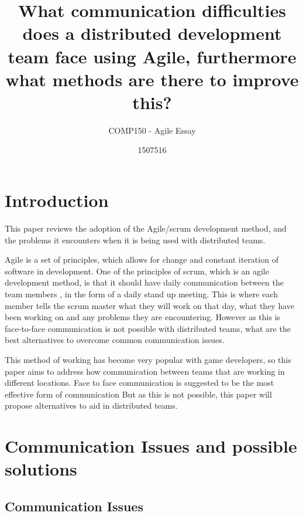 \documentclass{scrartcl}
\title{What communication difficulties does a distributed development team face using Agile, furthermore what methods are there to improve this?}
\subtitle{COMP150 - Agile Essay}
\author{1507516}
\begin{document}
\maketitle


\section{Introduction}

This paper reviews the adoption of the Agile/scrum development method, and the problems it encounters when it is being used with distributed teams.

Agile is a set of principles, which allows for change and constant iteration of software in development. One of the principles of scrum, which is an agile development method, is that it should have daily communication between the team members \cite{abdullah2011}, in the form of a daily stand up meeting. This is where each member tells the scrum master what they will work on that day, what they have been working on and any problems they are encountering. However as this is face-to-face communication is not possible with distributed teams, what are the best alternatives to overcome common communication issues.

This method of working has become very popular with game developers, so this paper aims to address how communication between teams that are working in different locations. 
Face to face communication is suggested to be the most effective form of communication \cite{joshi2013} But as this is not possible, this paper will propose alternatives to aid in distributed teams.

\section{Communication Issues and possible solutions}

\subsection{Communication Issues}
\end{document}
